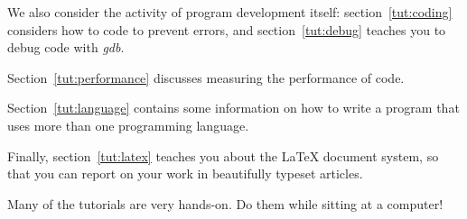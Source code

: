 We also consider the activity of program development itself:
section~\ref{tut:coding} considers how to code to prevent errors, and
section~\ref{tut:debug} teaches you to debug code with
\emph{gdb}. 
\begin{notready}
Section~\ref{tut:performance} discusses measuring the
performance of code.
\end{notready}
Section~\ref{tut:language} contains some information on
how to write a program that uses more than one programming language.

Finally, section~\ref{tut:latex} teaches you about the \LaTeX{}
document system, so that you can report on your work in beautifully
typeset articles.

Many of the tutorials are very hands-on. Do them while sitting at a
computer!
